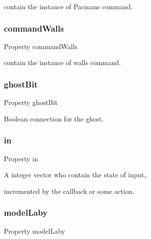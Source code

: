 contain the instance of Pacman\textquotesingle{}s command. 

\mbox{\label{class_wrapper_ae0183c9714a832124ccb420d5f9d3c1f}} 
\subsubsection{\texorpdfstring{command\+Walls}{commandWalls}}
{\footnotesize\ttfamily Property command\+Walls}



contain the instance of wall\textquotesingle{}s command. 

\mbox{\label{class_wrapper_ab08dd387d1dc363570e576d44a647def}} 
\subsubsection{\texorpdfstring{ghost\+Bit}{ghostBit}}
{\footnotesize\ttfamily Property ghost\+Bit}



Boolean connection for the ghost. 

\mbox{\label{class_wrapper_a5e252d97ca5bf85c5753e2914673eead}} 
\subsubsection{\texorpdfstring{in}{in}}
{\footnotesize\ttfamily Property in}



A integer vector who contain the state of input,. 

incremented by the callback or some action. \mbox{\label{class_wrapper_a65b2390d6d3e36b42ee0ea886a562d5c}} 
\subsubsection{\texorpdfstring{model\+Laby}{modelLaby}}
{\footnotesize\ttfamily Property model\+Laby}



